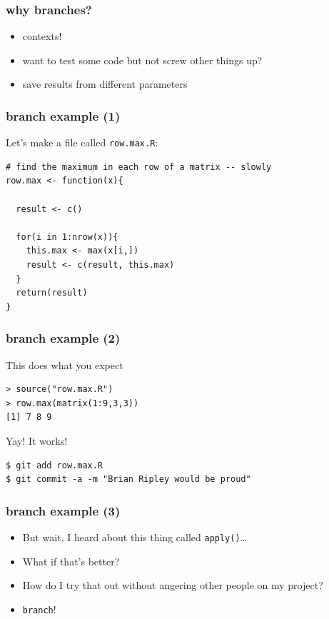 \documentclass[ignorenonframetext,]{beamer}
\begin{document}
\begin{frame}\frametitle{why branches?}

\begin{itemize}[<+->]
\item
  contexts!
\item
  want to test some code but not screw other things up?
\item
  save results from different parameters
\end{itemize}

\end{frame}

\begin{frame}[fragile]\frametitle{branch example (1)}

Let's make a file called \texttt{row.max.R}:

\begin{verbatim}
# find the maximum in each row of a matrix -- slowly
row.max <- function(x){

  result <- c()

  for(i in 1:nrow(x)){
    this.max <- max(x[i,])
    result <- c(result, this.max)
  }
  return(result)
}
\end{verbatim}

\end{frame}

\begin{frame}[fragile]\frametitle{branch example (2)}

This does what you expect

\begin{verbatim}
> source("row.max.R")
> row.max(matrix(1:9,3,3))
[1] 7 8 9
\end{verbatim}

Yay! It works!

\begin{verbatim}
$ git add row.max.R
$ git commit -a -m "Brian Ripley would be proud"
\end{verbatim}

\end{frame}

\begin{frame}[fragile]\frametitle{branch example (3)}

\begin{itemize}[<+->]
\item
  But wait, I heard about this thing called \texttt{apply()}\ldots{}
\item
  What if that's better?
\item
  How do I try that out without angering other people on my project?
\item
  \texttt{branch}!
\end{itemize}

\end{frame}
\end{document}
